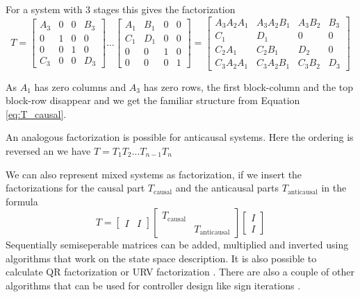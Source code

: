 \documentclass[doctype=mastersthesis,BCOR=15mm,biblatex]{ldvbook}%
\newcommand{\eye}{I} %
\begin{document}
For a system with 3 stages this gives the factorization
\begin{equation*}
	T=
	\left[\begin{matrix}A_{3} & 0 & 0 & B_{3}\\0 & 1 & 0 & 0\\0 & 0 & 1 & 0\\C_{3} & 0 & 0 & D_{3}\end{matrix}\right]
\dots
	\left[\begin{matrix}A_{1} & B_{1} & 0 & 0\\C_{1} & D_{1} & 0 & 0\\0 & 0 & 1 & 0\\0 & 0 & 0 & 1\end{matrix}\right]
	=
	\left[\begin{matrix}A_{3} A_{2} A_{1} & A_{3} A_{2} B_{1} & A_{3} B_{2} & B_{3}\\C_{1} & D_{1} & 0 & 0\\C_{2} A_{1} & C_{2} B_{1} & D_{2} & 0\\C_{3} A_{2} A_{1} & C_{3} A_{2} B_{1} & C_{3} B_{2} & D_{3}\end{matrix}\right]
\end{equation*}

As $A_1$ has zero columns and $A_3$ has zero rows, the first block-column and the top block-row disappear and we get the familiar structure from Equation\,\ref{eq:T_causal}.

An analogous factorization is possible for anticausal systems.
Here the ordering is reversed an we have $T = T_1 T_2 \dots T_{n-1} T_{n}$

We can also represent mixed systems as factorization, if we insert the factorizations for the causal part $T_{\text{causal}}$ and the anticausal parts $T_{\text{anticausal}}$ in the formula
\begin{equation}
	T = 
	\begin{bmatrix}
	\eye &
	\eye
	\end{bmatrix}
	\begin{bmatrix}
	T_{\text{causal}}&\\
	&T_{\text{anticausal}}
	\end{bmatrix}	
	\begin{bmatrix}
	\eye\\
	\eye
	\end{bmatrix}
\end{equation}
Sequentially semiseperable matrices can be added, multiplied and inverted using algorithms that work on the state space description.
It is also possible to calculate QR factorization \cite{chandrasekaran_fast_2002,tong_blind_2003} or URV factorization \cite{chandrasekaran_fast_2005}. 
There are also a couple of other algorithms that can be used for controller design like sign iterations \cite{rice_efficient_2010}.
\end{document}
